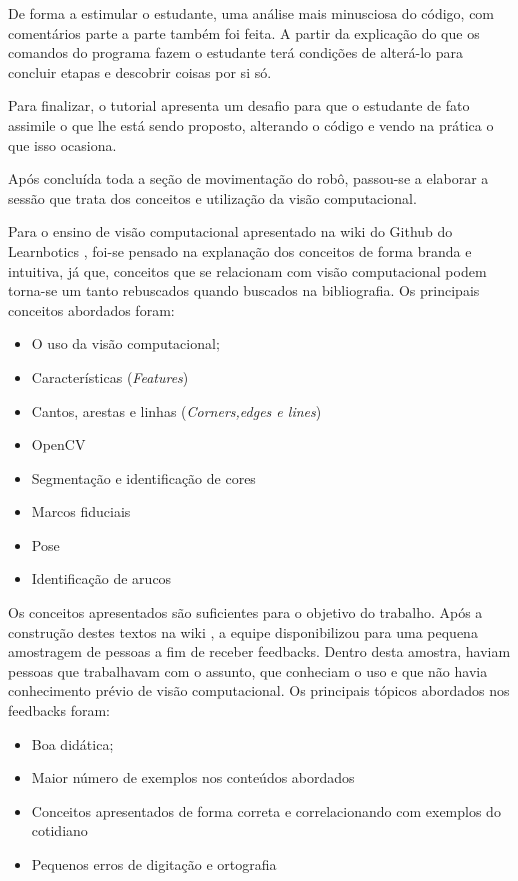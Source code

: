 De forma a estimular o estudante, uma análise mais minusciosa do código, com comentários parte a parte também foi feita. A partir da explicação do que os comandos do programa fazem o estudante terá condições de alterá-lo para concluir etapas e descobrir coisas por si só.

Para finalizar, o tutorial apresenta um desafio para que o estudante de fato assimile o que lhe está sendo proposto, alterando o código e vendo na prática o que isso ocasiona. \cite{tutCinemat}

Após concluída toda a seção de movimentação do robô, passou-se a elaborar a sessão que trata dos conceitos e utilização da visão computacional. 

Para o ensino de visão computacional apresentado na wiki do Github do Learnbotics \cite{wikilearn}, foi-se pensado na explanação dos conceitos de forma branda e intuitiva, já que, conceitos que se relacionam com visão computacional podem torna-se um tanto rebuscados quando buscados na bibliografia. Os principais conceitos abordados foram:
\begin{itemize}
	\item O uso da visão computacional;
	\item Características  (\textit{Features})
	\item Cantos, arestas e linhas (\textit{Corners,edges e lines})
	\item OpenCV
	\item Segmentação e identificação de cores
	\item Marcos fiduciais
	\item Pose
	\item Identificação de arucos
	
\end{itemize}

Os conceitos apresentados são suficientes para o objetivo do trabalho. Após a construção destes textos na wiki \cite{tutVis}, a equipe disponibilizou para uma pequena amostragem de pessoas a fim de receber feedbacks. Dentro desta amostra, haviam pessoas que trabalhavam com o assunto, que conheciam o uso e que não havia conhecimento prévio de visão computacional. Os principais tópicos abordados nos feedbacks foram:

\begin{itemize}
	\item Boa didática;
	\item Maior número de exemplos nos conteúdos abordados
	\item Conceitos apresentados de forma correta e correlacionando com exemplos do cotidiano
	\item Pequenos erros de digitação e ortografia
\end{itemize}

